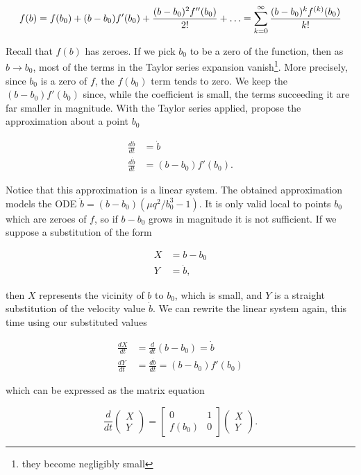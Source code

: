 \documentclass{article}
\begin{document}
\begin{equation}
    f(b) = f(b_0) + (b-b_0)f'(b_0) + \frac{(b-b_0)^2 f''(b_0)}{2!} + \mathellipsis = \sum_{k=0}^\infty\frac{(b-b_0)^{k}f^{(k)}(b_0)}{k!}
    \label{eqn:taylor_series}
\end{equation}

Recall that $f(b)$ has zeroes. If we pick $b_0$ to be a zero of the function, then as $b\rightarrow b_0$,
most of the terms in the Taylor series expansion vanish\footnote{they become negligibly small}.
More precisely, since $b_0$ is a zero of $f$, the $f(b_0)$ term tends to zero.
We keep the $(b-b_0)f'(b_0)$ since, while the coefficient is small,
the terms succeeding it are far smaller in magnitude.
With the Taylor series applied, propose the approximation about a point $b_0$

\begin{align}
    \frac{db}{dt}       & = \dot{b}         \\
    \frac{d\dot{b}}{dt} & = (b-b_0)f'(b_0).
    \label{eqn:first_order_approximated}
\end{align}

Notice that this approximation is a linear system. The obtained approximation models the ODE $\ddot{b} = (b-b_0)(\mu q^2/b_0^3-1)$.
It is only valid local to points $b_0$ which are zeroes of $f$, so if $b-b_0$ grows in magnitude it is not sufficient.
If we suppose a substitution of the form

\begin{align}
    X & = b - b_0  \\
    Y & = \dot{b},
\end{align}

then $X$ represents the vicinity of $b$ to $b_0$, which is small,
and $Y$ is a straight substitution of the velocity value $\dot{b}$.
We can rewrite the linear system again, this time using our substituted values

\begin{align}
    \frac{dX}{dt} & = \frac{d}{dt}\left(b-b_0\right) = \dot{b} \\
    \frac{dY}{dt} & = \frac{d\dot{b}}{dt} = (b-b_0)f'(b_0)
\end{align}

which can be expressed as the matrix equation

\begin{equation}
    \frac{d}{dt}\begin{pmatrix}
        X \\
        Y
    \end{pmatrix} = \begin{bmatrix}
        0      & 1 \\
        f(b_0) & 0
    \end{bmatrix} \begin{pmatrix}
        X \\
        Y
    \end{pmatrix}.
    \label{eqn:first_order_approximated_substituted_matrix}
\end{equation}
\end{document}

